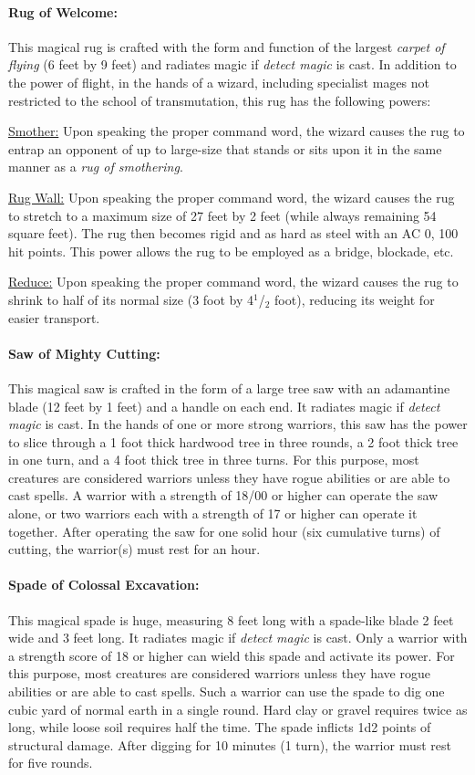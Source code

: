 \begin{multicols}{2}
\paragraph{Rug of Welcome:} This magical rug is crafted with the form and function of the largest \textit{carpet of flying} (6 feet by 9 feet) and radiates magic if \textit{detect magic} is cast.  In addition to the power of flight, in the hands of a wizard, including specialist mages not restricted to the school of transmutation, this rug has the following powers:

\underline{Smother:} Upon speaking the proper command word, the wizard causes the rug to entrap an opponent of up to large-size that stands or sits upon it in the same manner as a \textit{rug of smothering}.  

\underline{Rug Wall:} Upon speaking the proper command word, the wizard causes the rug to stretch to a maximum size of 27 feet by 2 feet (while always remaining 54 square feet).  The rug then becomes rigid and as hard as steel with an AC 0, 100 hit points.  This power allows the rug to be employed as a bridge, blockade, etc.

\underline{Reduce:} Upon speaking the proper command word, the wizard causes the rug to shrink to half of its normal size (3 foot by 4$^1$/$_2$ foot), reducing its weight for easier transport.

\paragraph{Saw of Mighty Cutting:} This magical saw is crafted in the form of a large tree saw with an adamantine blade (12 feet by 1 feet) and a handle on each end.  It radiates magic if \textit{detect magic} is cast.  In the hands of one or more strong warriors, this saw has the power to slice through a 1 foot thick hardwood tree in three rounds, a 2 foot thick tree in one turn, and a 4 foot thick tree in three turns.  For this purpose, most creatures are considered warriors unless they have rogue abilities or are able to cast spells.  A warrior with a strength of 18/00 or higher can operate the saw alone, or two warriors each with a strength of 17 or higher can operate it together.  After operating the saw for one solid hour (six cumulative turns) of cutting, the warrior(s) must rest for an hour.

\paragraph{Spade of Colossal Excavation:} This magical spade is huge, measuring 8 feet long with a spade-like blade 2 feet wide and 3 feet long.  It radiates magic if \textit{detect magic} is cast.  Only a warrior with a strength score of 18 or higher can wield this spade and activate its power.  For this purpose, most creatures are considered warriors unless they have rogue abilities or are able to cast spells.  Such a warrior can use the spade to dig one cubic yard of normal earth in a single round.  Hard clay or gravel requires twice as long, while loose soil requires half the time.  The spade inflicts 1d2 points of structural damage.  After digging for 10 minutes (1 turn), the warrior must rest for five rounds.
 

\end{multicols}
